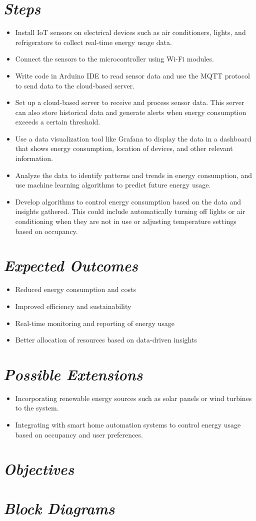 \documentclass{article}
\begin{document}
\section*{\textit{Steps}}
\begin{itemize}
    \item Install IoT sensors on electrical devices such as air conditioners, lights, and refrigerators to collect real-time energy usage data.
    \item Connect the sensors to the microcontroller using Wi-Fi modules.
    \item Write code in Arduino IDE to read sensor data and use the MQTT protocol to send data to the cloud-based server.
    \item Set up a cloud-based server to receive and process sensor data. This server can also store historical data and generate alerts when energy consumption exceeds a certain threshold.
    \item Use a data visualization tool like Grafana to display the data in a dashboard that shows energy consumption, location of devices, and other relevant information.
    \item Analyze the data to identify patterns and trends in energy consumption, and use machine learning algorithms to predict future energy usage.
    \item Develop algorithms to control energy consumption based on the data and insights gathered. This could include automatically turning off lights or air conditioning when they are not in use or adjusting temperature settings based on occupancy.
\end{itemize}
\section*{\textit{Expected Outcomes}}
\begin{itemize}
    \item Reduced energy consumption and costs
    \item Improved efficiency and sustainability
    \item Real-time monitoring and reporting of energy usage
    \item Better allocation of resources based on data-driven insights
\end{itemize}
\section*{\textit{Possible Extensions}}
\begin{itemize}
    \item Incorporating renewable energy sources such as solar panels or wind turbines to the system.
    \item Integrating with smart home automation systems to control energy usage based on occupancy and user preferences.
\end{itemize}
\section*{\textit{Objectives}}
\section*{\textit{Block Diagrams}}
\end{document}

